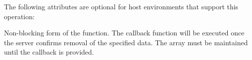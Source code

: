 \reqattrend

\optattrstart
The following attributes are optional for host environments that support this operation:


\optattrend

\descr

Non-blocking form of the  function.
The callback function will be executed once the server confirms removal of the specified data. The  array must be maintained until the callback is provided.



